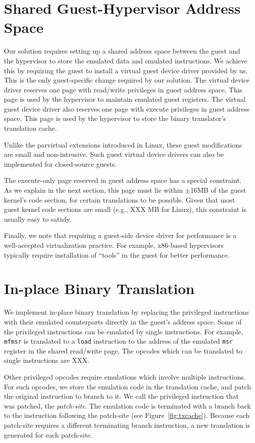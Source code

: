 \documentclass[10pt,twocolumn]{article}
\begin{document}
\section{Shared Guest-Hypervisor Address Space}
\label{sec:sharedspace}
Our solution requires setting up a shared address space between the
guest and the hypervisor to store the emulated
data and emulated instructions.
We achieve this by requiring the guest to install a virtual guest
device driver provided by us. This is the
only guest-specific change required by our solution. The virtual
device driver reserves
one page with read/write privileges in guest address space. This page
is used by the hypervisor to maintain
emulated guest registers. The virtual guest device driver also
reserves one page with execute privileges in guest address space.
This page is used by the hypervisor to store the binary translator's
translation cache.

Unlike the parvirtual extensions introduced in Linux, these guest
modifications are small and non-intrusive. Such guest virtual device drivers
can also be implemented for closed-source guests.

The execute-only page reserved in guest address space has a special
constraint. As we explain in the
next section, this page must lie within $\pm$16MB of the
guest kernel's code section, for certain translations to be possible.
Given that most guest kernel code sections are
small (e.g., XXX MB for Linux), this constraint is usually easy to satisfy.

Finally, we note that requiring a guest-side device driver for performance
is a well-accepted virtualization practice. For example, x86-based hypervisors
typically require installation of ``tools'' in the guest for better performance.

\section{In-place Binary Translation}
\label{sec:bintrans}
We implement in-place binary translation by replacing the
privileged instructions
with their emulated counterparts directly
in the guest's address space. Some of the privileged instructions can
be emulated by single instructions. For example, {\tt mfmsr} is translated
to a {\tt load} instruction to the address of the emulated {\tt msr}
register in the shared read/write page. The opcodes which can be
translated to single instructions are XXX.

Other privileged opcodes require emulations which involve multiple instructions.
For such opcodes, we store the emulation code in the translation cache, and
patch the original instruction to branch to it. We call the privileged instruction
that was patched, the {\em patch-site}. The emulation code is terminated
with a branch back to the instruction following the patch-site
(see Figure~\ref{fig:txcache}). Because each patch-site requires a different
terminating branch instruction, a new translation is generated for
each patch-site.
\end{document}
